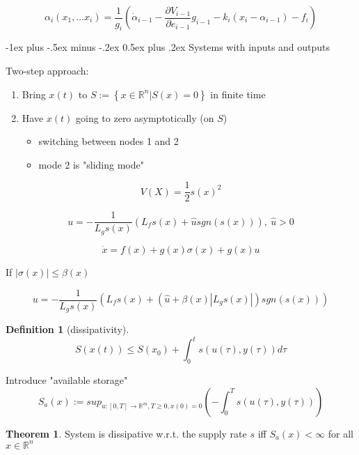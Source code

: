 \documentclass[10pt,landscape]{article}
\makeatletter
\theoremstyle{definition}
\newtheorem{Theorem}{Theorem}[section]
\newtheorem*{Definition}{Definition}
\renewcommand{\section}{\@startsection{section}{1}{0mm}%
                                {-1ex plus -.5ex minus -.2ex}%
                                {0.5ex plus .2ex}%
                                {\normalfont\large\bfseries}}
\makeatother
\begin{document}
\begin{multicols}{4}
$$\alpha_i(x_1, \dots x_i) = \frac{1}{g_i}(\dot \alpha_{i-1} - \frac{\partial V_{i-1}}{\partial e_{i-1}}g_{i-1}-k_i(x_i-\alpha_{i-1})-f_i)$$

\section{Systems with inputs and outputs}

Two-step approach:
\begin{enumerate}
\item Bring $x(t)$ to $S := \left \{ x \in \mathbb{R}^n | S(x) = 0 \right\}$ in finite time
\item Have $x(t)$ going to zero asymptotically (on $S$)
\begin{itemize}
\item switching between nodes 1 and 2
\item mode 2 is "sliding mode"
\end{itemize}
\end{enumerate} 

$$V(X) = \frac{1}{2}s(x)^2$$

\begin{equation*}
u = - \frac{1}{L_gs(x)}(L_fs(x) + \hat{u}sgn(s(x))), \ \hat{u} > 0
\end{equation*}

\begin{equation*}
\dot{x} = f(x) + g(x) \sigma (x) + g(x)u 
\end{equation*}

If $|\sigma (x)| \leq \beta (x)$

\begin{equation*}
u = - \frac{1}{L_gs(x)}(L_fs(x) + (\hat{u} + \beta (x) |L_gs(x)|) sgn(s(x)))
\end{equation*}

\begin{Definition}[dissipativity]
\begin{equation}\label{DIE}
S(x(t)) \leq S(x_0)
 + \int_0^ts(u(\tau), y(\tau))d\tau
\end{equation}
\end{Definition}

Introduce "available storage"
\begin{equation*}
S_a(x) := sup_{u:[0,T] \to \mathbb{R}^m, T \geq 0, x(0) = 0} (- \int_0^Ts(u(\tau),y(\tau)))
\end{equation*}

\begin{Theorem}
System is dissipative w.r.t. the supply rate $s$ iff $S_a(x) < \infty$ for all $x \in \mathbb{R}^n$


\end{Theorem}
\end{multicols}
\end{document}
